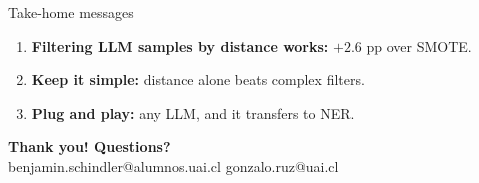 \begin{frame}[t]{Take-home messages}
\vspace{1.0em}
\begin{enumerate}\setlength\itemsep{12pt}\large
  \item \textbf{Filtering LLM samples by distance works:} $+2.6$ pp over SMOTE.
  \item \textbf{Keep it simple:} distance alone beats complex filters.
  \item \textbf{Plug and play:} any LLM, and it transfers to NER.
\end{enumerate}

\vfill
\begin{center}
\begin{tcolorbox}[colback=uaibluedark, colframe=uaibluedark, coltext=white,
                  width=0.8\linewidth, halign=center, arc=4pt,
                  top=2pt, bottom=2pt]
\textbf{Thank you! Questions?}\\[2pt]
{\scriptsize benjamin.schindler@alumnos.uai.cl \textperiodcentered{} gonzalo.ruz@uai.cl}
\end{tcolorbox}
\end{center}
\end{frame}
